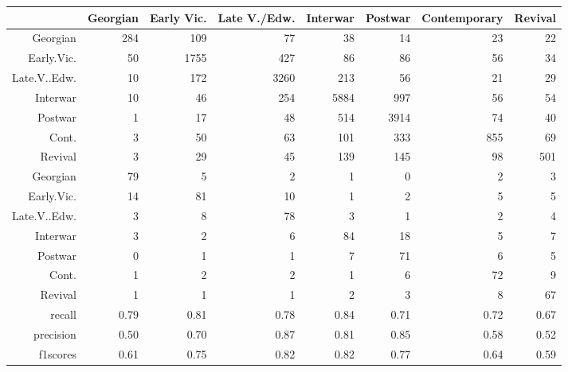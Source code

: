 \begin{table}[ht]
\centering
\begingroup\footnotesize
\begin{tabular}{rrrrrrrr}
  \toprule
 & Georgian & Early Vic. & Late V./Edw. & Interwar & Postwar & Contemporary & Revival \\ 
  \midrule
Georgian & 284 & 109 & 77 & 38 & 14 & 23 & 22 \\ 
  Early.Vic. & 50 & 1755 & 427 & 86 & 86 & 56 & 34 \\ 
  Late.V..Edw. & 10 & 172 & 3260 & 213 & 56 & 21 & 29 \\ 
  Interwar & 10 & 46 & 254 & 5884 & 997 & 56 & 54 \\ 
  Postwar & 1 & 17 & 48 & 514 & 3914 & 74 & 40 \\ 
  Cont. & 3 & 50 & 63 & 101 & 333 & 855 & 69 \\ 
  Revival & 3 & 29 & 45 & 139 & 145 & 98 & 501 \\ 
  Georgian & 79 & 5 & 2 & 1 & 0 & 2 & 3 \\ 
  Early.Vic. & 14 & 81 & 10 & 1 & 2 & 5 & 5 \\ 
  Late.V..Edw. & 3 & 8 & 78 & 3 & 1 & 2 & 4 \\ 
  Interwar & 3 & 2 & 6 & 84 & 18 & 5 & 7 \\ 
  Postwar & 0 & 1 & 1 & 7 & 71 & 6 & 5 \\ 
  Cont. & 1 & 2 & 2 & 1 & 6 & 72 & 9 \\ 
  Revival & 1 & 1 & 1 & 2 & 3 & 8 & 67 \\ 
  recall & 0.79 & 0.81 & 0.78 & 0.84 & 0.71 & 0.72 & 0.67 \\ 
  precision & 0.50 & 0.70 & 0.87 & 0.81 & 0.85 & 0.58 & 0.52 \\ 
  f1scores & 0.61 & 0.75 & 0.82 & 0.82 & 0.77 & 0.64 & 0.59 \\ 
   \bottomrule
\end{tabular}
\endgroup
\end{table}
